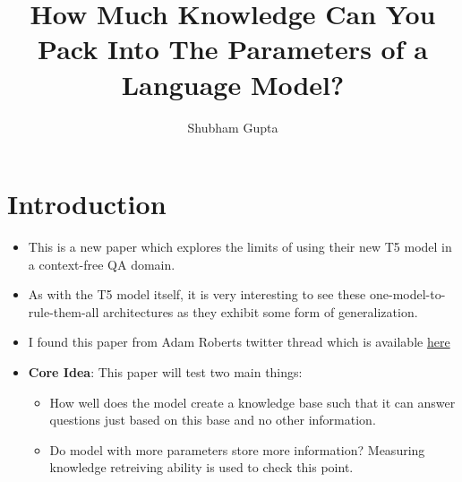 \documentclass[a4paper]{article}
\title{How Much Knowledge Can You Pack Into The Parameters of a Language Model?}
\author{Shubham Gupta}
\begin{document}
\maketitle
\section{Introduction}
\begin{itemize}
    \item This is a new paper which explores the limits of using their new T5 model in a context-free QA domain.
    \item As with the T5 model itself, it is very interesting to see these one-model-to-rule-them-all architectures as they exhibit some form of generalization.
    \item I found this paper from Adam Roberts twitter thread which is available \href{https://twitter.com/ada_rob/status/1227062195671822336}{here} 
    \item \textbf{Core Idea}: This paper will test two main things:
        \begin{itemize}
            \item How well does the model create a knowledge base such that it can answer questions just based on this base and no other information.
            \item Do model with more parameters store more information? Measuring knowledge retreiving ability is used to check this point.
        \end{itemize}
\end{itemize}
\end{document}
